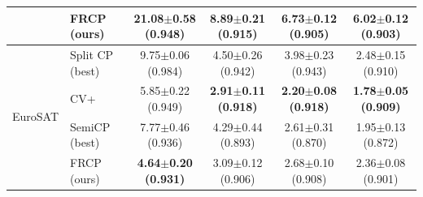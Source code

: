 \begin{table}[t]
\begin{tabular}{llcccc}
 & FRCP (ours) & \textbf{21.08$\pm$0.58 {\scriptsize(0.948)}} & \textbf{8.89$\pm$0.21 {\scriptsize(0.915)}} & \textbf{6.73$\pm$0.12 {\scriptsize(0.905)}} & 6.02$\pm$0.12 {\scriptsize(0.903)}\\
\midrule
\multirow{4}{*}{EuroSAT} & Split CP (best) & 9.75$\pm$0.06 {\scriptsize(0.984)} & 4.50$\pm$0.26 {\scriptsize(0.942)} & 3.98$\pm$0.23 {\scriptsize(0.943)} & 2.48$\pm$0.15 {\scriptsize(0.910)}\\
 & CV+ & 5.85$\pm$0.22 {\scriptsize(0.949)} & \textbf{2.91$\pm$0.11 {\scriptsize(0.918)}} & \textbf{2.20$\pm$0.08 {\scriptsize(0.918)}} & \textbf{1.78$\pm$0.05 {\scriptsize(0.909)}}\\
 & SemiCP (best) & 7.77$\pm$0.46 {\scriptsize(0.936)} & 4.29$\pm$0.44 {\scriptsize(0.893)} & 2.61$\pm$0.31 {\scriptsize(0.870)} & 1.95$\pm$0.13 {\scriptsize(0.872)}\\
 & FRCP (ours) & \textbf{4.64$\pm$0.20 {\scriptsize(0.931)}} & 3.09$\pm$0.12 {\scriptsize(0.906)} & 2.68$\pm$0.10 {\scriptsize(0.908)} & 2.36$\pm$0.08 {\scriptsize(0.901)}\\
\bottomrule
\end{tabular}
\end{table}
